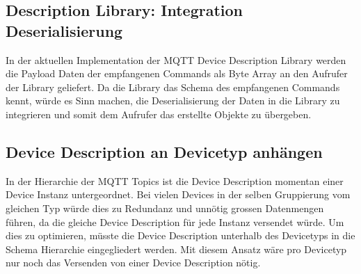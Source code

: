 \subsection{Description Library: Integration Deserialisierung}
In der aktuellen Implementation der MQTT Device Description Library werden die Payload Daten der empfangenen Commands als Byte Array an den Aufrufer der Library geliefert.
Da die Library das Schema des empfangenen Commands kennt, würde es Sinn machen, die Deserialisierung der Daten in die Library zu integrieren und somit dem Aufrufer das erstellte Objekte zu übergeben.

\subsection{Device Description an Devicetyp anhängen}
In der Hierarchie der MQTT Topics ist die Device Description momentan einer Device Instanz untergeordnet. Bei vielen Devices in der selben Gruppierung vom gleichen Typ würde dies zu Redundanz und unnötig grossen Datenmengen führen, da die gleiche Device Description für jede Instanz versendet würde. Um dies zu optimieren, müsste die Device Description unterhalb des Devicetyps in die Schema Hierarchie eingegliedert werden. Mit diesem Ansatz wäre pro Devicetyp nur noch das Versenden von einer Device Description nötig.
